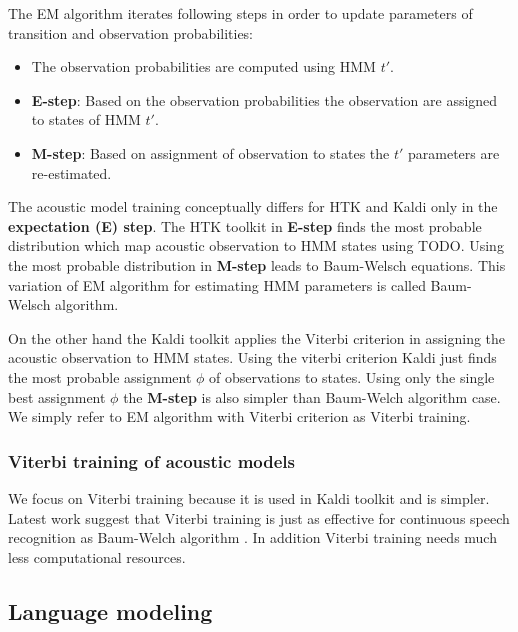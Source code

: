 {The \ac{EM} algorithm iterates following steps in order to update parameters of transition and observation probabilities:
\begin{itemize}
    \item The observation probabilities are computed using \ac{HMM} $t'$. 
    \item {\bf E-step}: Based on the observation probabilities the observation are assigned to states of \ac{HMM} $t'$. 
    \item {\bf M-step}: Based on assignment of observation to states the $t'$ parameters are re-estimated. 
\end{itemize}

The acoustic model training conceptually differs for \ac{HTK} and Kaldi only in the {\bf expectation (E) step}.
The \ac{HTK} toolkit in {\bf E-step} finds the most probable distribution which map acoustic observation to \ac{HMM} states using TODO. 
Using the most probable distribution in {\bf M-step} leads to Baum-Welsch equations. \cite{TODO}
This variation of \ac{EM} algorithm for estimating \ac{HMM} parameters is called Baum-Welsch algorithm.

On the other hand the Kaldi toolkit applies the Viterbi 
criterion in assigning the acoustic observation to \ac{HMM} states.
Using the viterbi criterion Kaldi just finds 
the most probable assignment $\phi$ of observations to states.\cite{buthpitiya2012parallel}
Using only the single best assignment $\phi$ the {\bf M-step} is also simpler than
Baum-Welch algorithm case.
We simply refer to \ac{EM} algorithm with Viterbi criterion as Viterbi training.

\subsubsection*{Viterbi training of acoustic models}
We focus on Viterbi training because it is used in Kaldi toolkit and is simpler.
Latest work suggest that Viterbi training is just as effective for continuous
speech recognition as Baum-Welch algorithm \cite{rodriguez2003comparative}.
In addition Viterbi training needs much less computational resources. 




\subsection{Language modeling}
\label{sub:lm}

}
